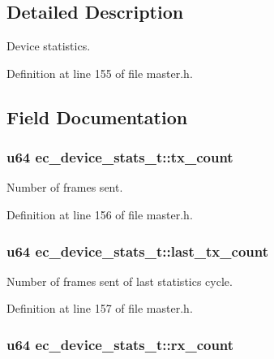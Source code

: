 \subsection{Detailed Description}
Device statistics. 

Definition at line 155 of file master.\-h.



\subsection{Field Documentation}
\subsubsection[{tx\-\_\-count}]{\setlength{\rightskip}{0pt plus 5cm}u64 ec\-\_\-device\-\_\-stats\-\_\-t\-::tx\-\_\-count}\label{structec__device__stats__t_a712dc5c0b9652b59fe8dfda4cd5cb0fe}


Number of frames sent. 



Definition at line 156 of file master.\-h.

\subsubsection[{last\-\_\-tx\-\_\-count}]{\setlength{\rightskip}{0pt plus 5cm}u64 ec\-\_\-device\-\_\-stats\-\_\-t\-::last\-\_\-tx\-\_\-count}\label{structec__device__stats__t_ab7ad452fd25c6e0470249165d8b5757f}


Number of frames sent of last statistics cycle. 



Definition at line 157 of file master.\-h.

\subsubsection[{rx\-\_\-count}]{\setlength{\rightskip}{0pt plus 5cm}u64 ec\-\_\-device\-\_\-stats\-\_\-t\-::rx\-\_\-count}\label{structec__device__stats__t_aca29f0a6107eab8e7438ea53078183af}


